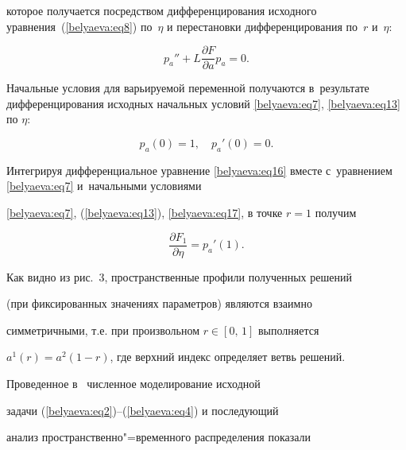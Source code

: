 \noindent

которое получается посредством дифференцирования исходного уравнения~(\ref{belyaeva:eq8}) по~$\eta $ и перестановки дифференцирования по~$r$ и~$\eta$:

\begin{equation} \label{belyaeva:eq16}

p_a'' + L\frac{\partial F}{\partial a} p_a =0.

\end{equation}





\noindent

Начальные условия для варьируемой переменной получаются в~результате дифференцирования исходных начальных условий \eqref{belyaeva:eq7}, \eqref{belyaeva:eq13} по $\eta$:

\begin{equation}\label{belyaeva:eq17}

p_a(0)=1, \quad p_a'(0)=0.

\end{equation}









\noindent

Интегрируя дифференциальное уравнение \eqref{belyaeva:eq16} вместе с~уравнением \eqref{belyaeva:eq7} и~начальными условиями

\eqref{belyaeva:eq7}, (\ref{belyaeva:eq13}), \eqref{belyaeva:eq17}, в точке $r=1$ получим

$$

\frac{\partial F_1}{\partial \eta } =p_a'(1).

$$





Как видно из рис.~3, пространственные профили полученных решений

(при фиксированных значениях параметров) являются взаимно

симметричными, т.е. при произвольном $r\in [0,\,1]$ выполняется

\mbox{$a^1 (r)=a^2 (1-r)$}, где верхний индекс определяет ветвь решений.

Проведенное в~\cite{Bel,Vestn} численное моделирование исходной

задачи (\ref{belyaeva:eq2})--(\ref{belyaeva:eq4}) и последующий

анализ пространственно"=временного распределения показали

